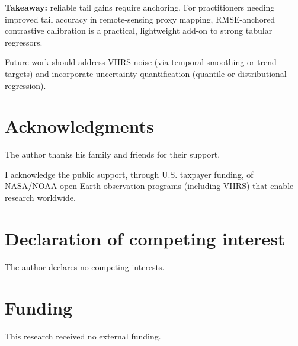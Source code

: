 \documentclass[preprint,12pt]{elsarticle}
\begin{document}
\textbf{Takeaway:} reliable tail gains require anchoring. For practitioners needing improved tail accuracy in remote-sensing proxy mapping, RMSE-anchored contrastive calibration is a practical, lightweight add-on to strong tabular regressors.


Future work should address VIIRS noise (via temporal smoothing or trend targets) and incorporate uncertainty quantification (quantile or distributional regression).


\section*{Acknowledgments}

The author thanks his family and friends for their support.

I acknowledge the public support, through U.S. taxpayer funding, of NASA/NOAA open Earth observation programs (including VIIRS) that enable research worldwide.

\section*{Declaration of competing interest}
The author declares no competing interests.

\section*{Funding}
This research received no external funding.
\end{document}
